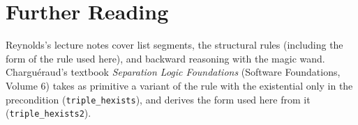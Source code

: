 \section*{Further Reading}

Reynolds's lecture notes cover list segments, the structural rules (including the form of the
 rule used here), and backward reasoning with the magic wand. Chargu\'eraud's textbook
\emph{Separation Logic Foundations} (Software Foundations, Volume 6) takes as primitive a variant of
the  rule with the existential only in the precondition (\texttt{triple\_hexists}), and
derives the form used here from it (\texttt{triple\_hexists2}).

% 
